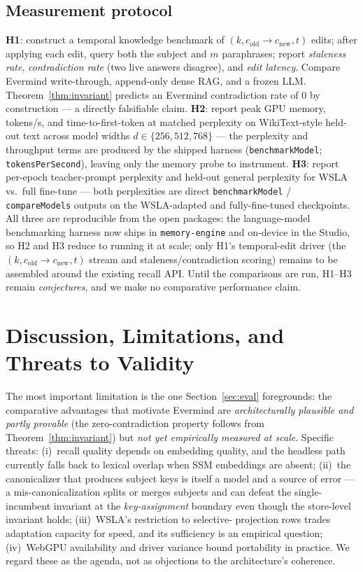 \documentclass[journal,onecolumn,11pt]{IEEEtran}
\begin{document}
\subsection{Measurement protocol}
\label{sec:protocol}
\textbf{H1}: construct a temporal knowledge benchmark of $(k, c_{\text{old}}\!\to
c_{\text{new}}, t)$ edits; after applying each edit, query both the subject and
$m$ paraphrases; report \emph{staleness rate}, \emph{contradiction rate} (two
live answers disagree), and \emph{edit latency}. Compare Evermind write-through,
append-only dense RAG, and a frozen LLM. Theorem~\ref{thm:invariant} predicts an
Evermind contradiction rate of $0$ by construction --- a directly falsifiable
claim. \textbf{H2}: report peak GPU memory, tokens/s, and time-to-first-token at
matched perplexity on WikiText-style held-out text across model widths
$d\in\{256,512,768\}$ --- the perplexity and throughput terms are produced by
the shipped harness (\texttt{benchmarkModel}; \texttt{tokensPerSecond}),
leaving only the memory probe to instrument. \textbf{H3}: report per-epoch
teacher-prompt perplexity and held-out general perplexity for WSLA vs.\ full
fine-tune --- both perplexities are direct \texttt{benchmarkModel} /
\texttt{compareModels} outputs on the WSLA-adapted and fully-fine-tuned
checkpoints. All three are reproducible from the open packages: the
language-model benchmarking harness now ships in \texttt{memory-engine} and
on-device in the Studio, so H2 and H3 reduce to running it at scale; only H1's
temporal-edit driver (the $(k,c_{\text{old}}\!\to c_{\text{new}},t)$ stream and
staleness/contradiction scoring) remains to be assembled around the existing
recall API. Until the comparisons are run, H1--H3 remain \emph{conjectures},
and we make no comparative performance claim.

\section{Discussion, Limitations, and Threats to Validity}
The most important limitation is the one Section~\ref{sec:eval} foregrounds: the
comparative advantages that motivate Evermind are \emph{architecturally
plausible and partly provable} (the zero-contradiction property follows from
Theorem~\ref{thm:invariant}) but \emph{not yet empirically measured at scale}.
Specific threats: (i)~recall quality depends on embedding quality, and the
headless path currently falls back to lexical overlap when SSM embeddings are
absent; (ii)~the canonicalizer that produces subject keys is itself a model and a
source of error --- a mis-canonicalization splits or merges subjects and can
defeat the single-incumbent invariant at the \emph{key-assignment} boundary even
though the store-level invariant holds; (iii)~WSLA's restriction to selective-
projection rows trades adaptation capacity for speed, and its sufficiency is an
empirical question; (iv)~WebGPU availability and driver variance bound
portability in practice. We regard these as the agenda, not as objections to the
architecture's coherence.
\end{document}
